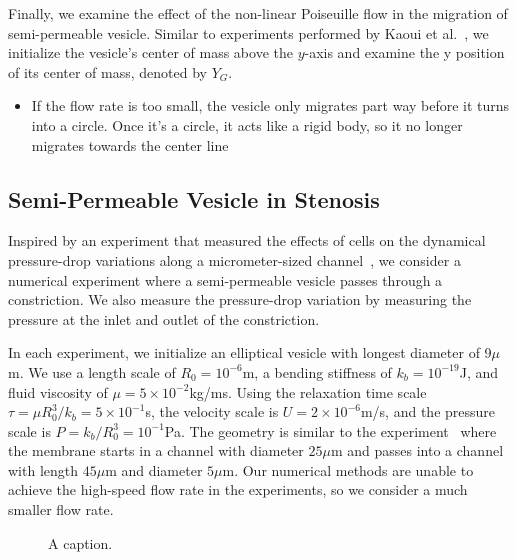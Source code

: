 \documentclass[9pt,twocolumn,twoside,lineno]{pnas-new}
\newif\ifTikz
\begin{document}
Finally, we examine the effect of the non-linear Poiseuille flow in the
migration of semi-permeable vesicle. Similar to experiments performed by
Kaoui et al.~\cite{kao-bir-mis2009}, we initialize the vesicle's
center of mass above the $y$-axis and examine the y position of its
center of mass, denoted by $Y_G$.

\begin{itemize}
  \item If the flow rate is too small, the vesicle only migrates part
    way before it turns into a circle. Once it's a circle, it acts like
    a rigid body, so it no longer migrates towards the center line
\end{itemize}

\subsection*{Semi-Permeable Vesicle in Stenosis}
Inspired by an experiment that measured the effects of cells on the
dynamical pressure-drop variations along a micrometer-sized
channel~\cite{abk-fai-sto2006}, we consider a numerical experiment where
a semi-permeable vesicle passes through a constriction. We also measure
the pressure-drop variation by measuring the pressure at the inlet and
outlet of the constriction. 

In each experiment, we initialize an elliptical vesicle with longest
diameter of 9$\mu$m. We use a length scale of $R_0 = 10^{-6}$m, a
bending stiffness of $k_b = 10^{-19}$J, and fluid viscosity of $\mu=5
\times 10^{-2}$kg/ms. Using the relaxation time scale $\tau = \mu
R_0^3/k_b = 5 \times 10^{-1}$s, the velocity scale is $U = 2 \times
10^{-6}$m/s, and the pressure scale is $P = k_b/R_0^3 = 10^{-1}$Pa.  The
geometry is similar to the experiment~\cite{abk-fai-sto2006} where the
membrane starts in a channel with diameter $25\mu$m and passes into a
channel with length $45\mu$m and diameter $5\mu$m. Our numerical methods
are unable to achieve the high-speed flow rate in the experiments, so we
consider a much smaller flow rate.

\begin{figure}[htp]
  
  \caption{\label{fig:stenosisGeom} A caption.}
\end{figure}



% 
 
\end{document}
